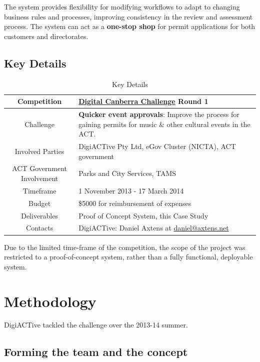 \documentclass[12pt,a4paper,twosided]{article}
\begin{document}
The system provides flexibility for modifying workflows to adapt to
changing business rules and processes, improving consistency in the
review and assessment process. The system can act as a \textbf{one-stop
shop} for permit applications for both customers and directorates.

\subsection{Key Details}


\begin{table}[h!]
  \centering
  \begin{tabular}{|c|l|}
    \hline
Competition & \href{http://digitalcanberrachallenge.com.au}{Digital Canberra Challenge} Round 1 \\ \hline
Challenge & \textbf{Quicker event approvals}: Improve the process for gaining permits for music \& other cultural events in the ACT. \\ \hline
Involved Parties & DigiACTive Pty Ltd, eGov Cluster (NICTA), ACT
government \\ \hline
ACT Government Involvement & Parks and City Services, TAMS \\ \hline
Timeframe & 1 November 2013 - 17 March 2014 \\ \hline
Budget & \$5000 for reimbursement of expenses \\ \hline
Deliverables & Proof of Concept System, this Case Study \\ \hline
Contacts & DigiACTive: Daniel Axtens at
\href{mailto:daniel@axtens.net}{\href{mailto:daniel@axtens.net}{daniel@axtens.net}} \\ \hline
  \end{tabular}
  \caption{Key Details}
  \label{tab:keydetails}
\end{table}

Due to the limited time-frame of the competition, the scope of the project was restricted to a proof-of-concept system, rather than a fully functional, deployable system.


\newpage
\section{Methodology}

DigiACTive tackled the challenge over the 2013-14 summer.

\subsection{Forming the team and the concept}
\end{document}
